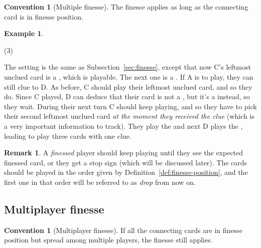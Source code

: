 \documentclass[a4paper]{article}
\theoremstyle{plain}
\theoremstyle{definition}
\newtheorem{remark}[theorem]{Remark}
\newtheorem{example}[theorem]{Example}
\newtheorem{convention}[theorem]{Convention}
\begin{document}
\begin{convention}[Multiple finesse]
	\label{multiple-finesse}
	The finesse applies as long as the connecting card is in finesse position.
\end{convention}

\begin{example}
	\hfill
	\begin{tasks}(3)
		\task[+]      
		\task[A]    
		\task[B]    
		\task[C]    
		\task[D]    
		\task[E]    
	\end{tasks}
	
	The setting is the same as Subsection~\ref{sec:finesse}, except that now C's leftmost unclued card is a , which is playable. The next one is a . If A is to play, they can still clue  to D. As before, C should play their leftmost unclued card, and so they do. Since C played, D can deduce that their card is not a , but it's a  instead, so they wait. During their next turn C should keep playing, and so they have to pick their second leftmost unclued card \textit{at the moment they received the clue} (which is a very important information to track). They play the  and next D plays the , leading to play three cards with one clue.
\end{example}

\begin{remark}
	A \textit{finessed} player should keep playing until they see the expected finessed card, or they get a stop sign (which will be discussed later). The cards should be played in the order given by Definition~\ref{def:finesse-position}, and the first one in that order will be referred to as \emph{drop} from now on.
\end{remark}

\subsection{Multiplayer finesse}

\begin{convention}[Multiplayer finesse]
	\label{multiplayer-finesse}
	If all the connecting cards are in finesse position but spread among multiple players, the finesse still applies.
\end{convention}
\end{document}
